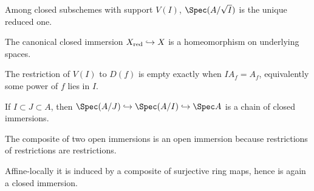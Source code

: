 \begin{example}\label{ex:vi22-ae09}
Among closed subschemes with support $V(I)$, $\Spec(A/\sqrt I)$ is the unique reduced one.
\end{example}

\begin{example}\label{ex:vi22-ae10}
The canonical closed immersion $X_{\rm red}\hookrightarrow X$ is a homeomorphism on underlying spaces.
\end{example}

\begin{example}\label{ex:vi22-ae11}
The restriction of $V(I)$ to $D(f)$ is empty exactly when $IA_f=A_f$, equivalently some power of $f$ lies in $I$.
\end{example}

\begin{example}\label{ex:vi22-ae12}
If $I\subset J\subset A$, then $\Spec(A/J)\hookrightarrow\Spec(A/I)\hookrightarrow\Spec A$ is a chain of closed immersions.
\end{example}

\begin{example}\label{ex:vi22-ae13}
The composite of two open immersions is an open immersion because restrictions of restrictions are restrictions.
\end{example}

\begin{example}\label{ex:vi22-ae14}
Affine-locally it is induced by a composite of surjective ring maps, hence is again a closed immersion.
\end{example}
